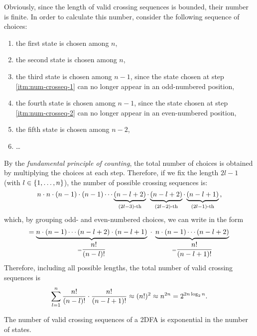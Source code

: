 Obviously, since the length of valid crossing sequences is bounded, their number is finite.
In order to calculate this number, consider the following sequence of choices:
\begin{enumerate}
	\item \label{itm:num-crosseq-1} the first state is chosen among $n$,
	\item \label{itm:num-crosseq-2} the second state is chosen among $n$,
	\item the third state is chosen among $n-1$, since the state chosen at step \ref{itm:num-crosseq-1} can no longer appear in an odd-numbered position,
	\item the fourth state is chosen among $n-1$, since the state chosen at step \ref{itm:num-crosseq-2} can no longer appear in an even-numbered position,
	\item the fifth state is chosen among $n-2$,
	\item[] \dots
\end{enumerate}
By the \emph{fundamental principle of counting}, the total number of choices is obtained by multiplying the choices at each step.
Therefore, if we fix the length $2l-1$ (with $l\in\{1,\dots,n\}$), the number of possible crossing sequences is:
\begin{equation*}
	n \cdot n \cdot (n-1) \cdot (n-1) \cdots \underbrace{(n-l+2)}_{(2l-3)\text{-th}} \cdot \underbrace{(n-l+2)}_{(2l-2)\text{-th}} \cdot \underbrace{(n-l+1)}_{(2l-1)\text{-th}} \text,
\end{equation*}
which, by grouping odd- and even-numbered choices, we can write in the form
\begin{equation*}
	= \underbrace{n \cdot (n-1) \cdots (n-l+2) \cdot (n-l+1)}_{=\dfrac{n!}{(n-l)!}} \; \cdot \; \underbrace{n \cdot (n-1) \cdots (n-l+2)}_{=\dfrac{n!}{(n-l+1)!}} \\
\end{equation*}
Therefore, including all possible lengths, the total number of valid crossing sequences is
\begin{align*}
	\sum_{l=1}^n \frac{n!}{(n-l)!}\cdot\frac{n!}{(n-l+1)!} \approx (n!)^2 \approx n^{2n} = 2^{2n \log_2 n} \text.
\end{align*}

\begin{fact}\label{fact:crossing-2DFA-num}
	The number of valid crossing sequences of a 2DFA is exponential in the number of states.
\end{fact}


